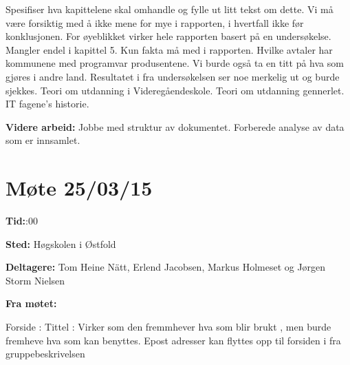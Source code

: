 \hspace{-17pt}Spesifiser hva kapittelene skal omhandle og fylle ut litt tekst om dette.\newline
Vi må være forsiktig med å ikke mene for mye i rapporten, i hvertfall ikke før konklusjonen.\newline
For øyeblikket virker hele rapporten basert på en undersøkelse.\newline
Mangler endel i kapittel 5. Kun fakta må med i rapporten.\newline
Hvilke avtaler har kommunene med programvar produsentene.\newline
Vi burde også ta en titt på hva som gjøres i andre land.\newline
Resultatet i fra undersøkelsen ser noe merkelig ut og burde sjekkes.\newline
Teori om utdanning i Videregåendeskole.
Teori om utdanning gennerlet.
IT fagene's historie.\newline

\hspace{-17pt}\textbf{Videre arbeid:}\newline
Jobbe med struktur av dokumentet.\newline
Forberede analyse av data som er innsamlet.\newline

\newpage

\section{Møte 25/03/15}

\textbf{Tid:}:00\newline 

\hspace{-17pt}\textbf{Sted:}\newline 
Høgskolen i Østfold
\newline

\hspace{-17pt}\textbf{Deltagere:}\newline 
Tom Heine Nätt, Erlend Jacobsen, Markus Holmeset og Jørgen Storm Nielsen\newline

\hspace{-17pt}\textbf{Fra møtet:}\newline

Forside : Tittel : Virker som den fremmhever hva som blir brukt , men burde fremheve hva som kan benyttes. Epost adresser kan flyttes opp til forsiden i fra gruppebeskrivelsen

